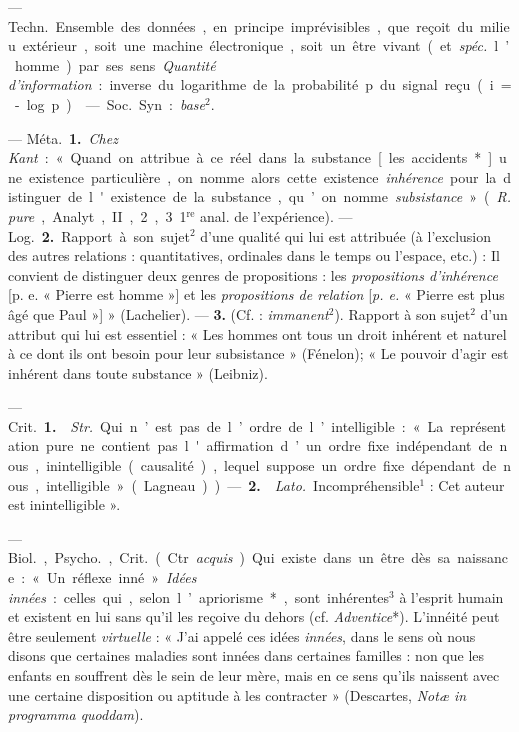 \begin{itemize}[leftmargin=1cm, label=, itemsep=1pt]
 — \si{Techn.} Ensemble des données, en principe
imprévisibles, que reçoit du milieu extérieur, soit une machine électronique,
soit un être vivant (et {\it spéc.} l’homme) par ses sens. {\it Quantité
d’information} : inverse du logarithme de la probabilité p du signal reçu
(i = - log p).

 — \si{Soc.} Syn. : {\it base}$^2$.

 — \si{Méta.} {\bf 1.} {\it Chez Kant} : « Quand on attribue à
ce réel dans la substance [les accidents*] une existence particulière, on
nomme alors cette existence {\it inhérence} pour la distinguer de l'existence
de la substance, qu’on nomme {\it subsistance} » ({\it R. pure}, Analyt., II,
2, 3 1$^\text{re}$ anal. de l'expérience). — \si{Log.}  {\bf 2.} Rapport à
son sujet$^2$ d’une qualité qui lui est attribuée (à l’exclusion des autres
relations : quantitatives, ordinales dans le temps ou l’espace, etc.) : Il
convient de distinguer deux genres de propositions : les {\it propositions
d’inhérence} [p. e. « Pierre est homme »] et les {\it propositions de
relation} [{\it p. e.} « Pierre est plus âgé que Paul »] » (Lachelier). —
{\bf 3.} (Cf. :
{\it immanent}$^2$). Rapport à son sujet$^2$ d'un attribut qui lui est
essentiel : « Les hommes ont tous un droit inhérent et naturel à ce dont ils
ont besoin pour leur subsistance » (Fénelon); « Le pouvoir d'agir est
inhérent dans toute substance » (Leibniz).

 — \si{Crit.} {\bf 1.}  {\it Str.} Qui
n’est pas de l’ordre de l’intelligible : « La représentation pure ne contient
pas l'affirmation d’un ordre fixe indépendant de nous, inintelligible
(causalité), lequel suppose un ordre fixe dépendant de nous,
intelligible » (Lagneau)). — {\bf 2.}  {\it Lato.}
Incompréhensible$^1$ : Cet auteur est inintelligible ».

 — \si{Biol.}, \si{Psycho.}, \si{Crit.} (Ctr. {\it acquis}). Qui
existe dans un être dès sa naissance : « Un réflexe inné ». {\it Idées
innées} : celles qui, selon l’apriorisme*, sont inhérentes$^3$ à l'esprit
humain et existent en lui sans qu'il les reçoive du dehors (cf.
{\it Adventice}*). L’innéité peut être seulement {\it virtuelle} : « J'ai
appelé ces idées {\it innées}, dans le sens où nous disons que certaines
maladies sont innées dans certaines familles : non que les enfants en
souffrent dès le sein de leur mère, mais en ce sens qu'ils naissent avec une
certaine disposition ou aptitude à les contracter » (Descartes, {\it Notæ in
programma quoddam}).


\end{itemize}
